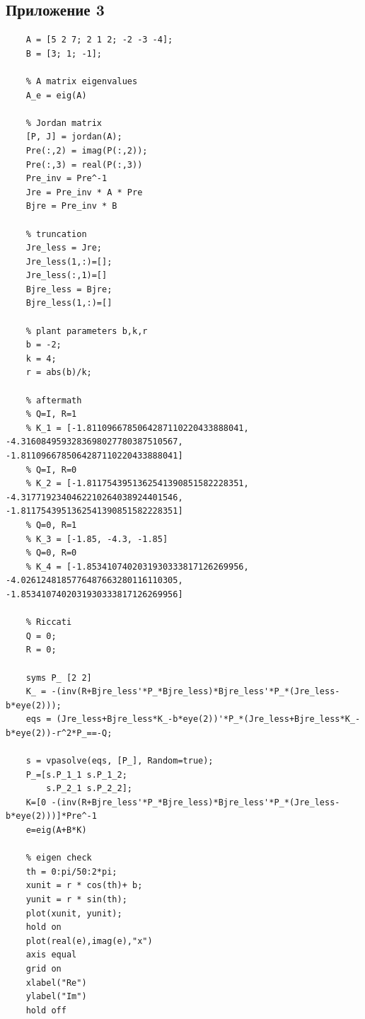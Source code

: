 \documentclass[a4paper, 12pt]{article}
\begin{document}
    \subsection{Приложение 3}
    \begin{lstlisting}[label=task3code, caption={Программа для третьего задания}]
    % plant parameters
    A = [5 2 7; 2 1 2; -2 -3 -4];
    B = [3; 1; -1];

    % A matrix eigenvalues
    A_e = eig(A)

    % Jordan matrix
    [P, J] = jordan(A);
    Pre(:,2) = imag(P(:,2));
    Pre(:,3) = real(P(:,3))
    Pre_inv = Pre^-1
    Jre = Pre_inv * A * Pre
    Bjre = Pre_inv * B

    % truncation
    Jre_less = Jre;
    Jre_less(1,:)=[];
    Jre_less(:,1)=[]
    Bjre_less = Bjre;
    Bjre_less(1,:)=[]

    % plant parameters b,k,r
    b = -2;
    k = 4;
    r = abs(b)/k;

    % aftermath
    % Q=I, R=1
    % K_1 = [-1.8110966785064287110220433888041, -4.3160849593283698027780387510567, -1.8110966785064287110220433888041]
    % Q=I, R=0
    % K_2 = [-1.8117543951362541390851582228351, -4.3177192340462210264038924401546, -1.8117543951362541390851582228351]
    % Q=0, R=1
    % K_3 = [-1.85, -4.3, -1.85]
    % Q=0, R=0
    % K_4 = [-1.8534107402031930333817126269956, -4.0261248185776487663280116110305, -1.8534107402031930333817126269956]

    % Riccati
    Q = 0;
    R = 0;

    syms P_ [2 2]
    K_ = -(inv(R+Bjre_less'*P_*Bjre_less)*Bjre_less'*P_*(Jre_less-b*eye(2)));
    eqs = (Jre_less+Bjre_less*K_-b*eye(2))'*P_*(Jre_less+Bjre_less*K_-b*eye(2))-r^2*P_==-Q;

    s = vpasolve(eqs, [P_], Random=true);
    P_=[s.P_1_1 s.P_1_2;
        s.P_2_1 s.P_2_2];
    K=[0 -(inv(R+Bjre_less'*P_*Bjre_less)*Bjre_less'*P_*(Jre_less-b*eye(2)))]*Pre^-1
    e=eig(A+B*K)

    % eigen check
    th = 0:pi/50:2*pi;
    xunit = r * cos(th)+ b;
    yunit = r * sin(th);
    plot(xunit, yunit);
    hold on
    plot(real(e),imag(e),"x")
    axis equal
    grid on
    xlabel("Re")
    ylabel("Im")
    hold off
    \end{lstlisting}
\end{document}
